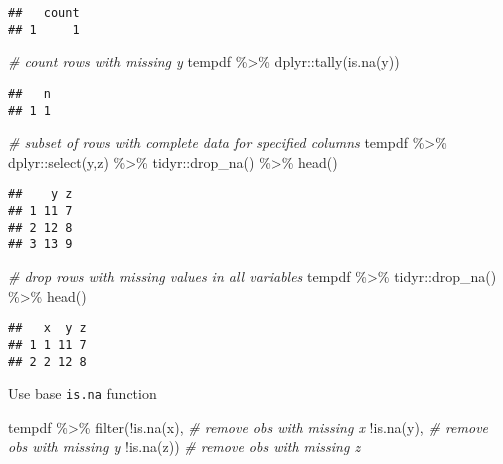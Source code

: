 \documentclass[
]{book}
\newenvironment{Shaded}{\begin{snugshade}}{\end{snugshade}}
\newcommand{\CommentTok}[1]{\textcolor[rgb]{0.56,0.35,0.01}{\textit{#1}}}
\newcommand{\FunctionTok}[1]{\textcolor[rgb]{0.00,0.00,0.00}{#1}}
\newcommand{\NormalTok}[1]{#1}
\newcommand{\SpecialCharTok}[1]{\textcolor[rgb]{0.00,0.00,0.00}{#1}}
\begin{document}
\begin{verbatim}
##   count
## 1     1
\end{verbatim}

\begin{Shaded}
\begin{Highlighting}[]
\CommentTok{\# count rows with missing y}
\NormalTok{tempdf }\SpecialCharTok{\%\textgreater{}\%}
\NormalTok{  dplyr}\SpecialCharTok{::}\FunctionTok{tally}\NormalTok{(}\FunctionTok{is.na}\NormalTok{(y))}
\end{Highlighting}
\end{Shaded}

\begin{verbatim}
##   n
## 1 1
\end{verbatim}

\begin{Shaded}
\begin{Highlighting}[]
\CommentTok{\# subset of rows with complete data for specified columns}
\NormalTok{tempdf }\SpecialCharTok{\%\textgreater{}\%}
\NormalTok{  dplyr}\SpecialCharTok{::}\FunctionTok{select}\NormalTok{(y,z) }\SpecialCharTok{\%\textgreater{}\%}
\NormalTok{  tidyr}\SpecialCharTok{::}\FunctionTok{drop\_na}\NormalTok{() }\SpecialCharTok{\%\textgreater{}\%}
  \FunctionTok{head}\NormalTok{()}
\end{Highlighting}
\end{Shaded}

\begin{verbatim}
##    y z
## 1 11 7
## 2 12 8
## 3 13 9
\end{verbatim}

\begin{Shaded}
\begin{Highlighting}[]
\CommentTok{\#   drop rows with missing values in all variables}
\NormalTok{tempdf }\SpecialCharTok{\%\textgreater{}\%}
\NormalTok{  tidyr}\SpecialCharTok{::}\FunctionTok{drop\_na}\NormalTok{() }\SpecialCharTok{\%\textgreater{}\%}
  \FunctionTok{head}\NormalTok{()}
\end{Highlighting}
\end{Shaded}

\begin{verbatim}
##   x  y z
## 1 1 11 7
## 2 2 12 8
\end{verbatim}

Use base \texttt{is.na} function

\begin{Shaded}
\begin{Highlighting}[]
\NormalTok{tempdf }\SpecialCharTok{\%\textgreater{}\%}
  \FunctionTok{filter}\NormalTok{(}\SpecialCharTok{!}\FunctionTok{is.na}\NormalTok{(x),           }\CommentTok{\# remove obs with missing x}
         \SpecialCharTok{!}\FunctionTok{is.na}\NormalTok{(y),  }\CommentTok{\# remove obs with missing y}
         \SpecialCharTok{!}\FunctionTok{is.na}\NormalTok{(z))                }\CommentTok{\# remove obs with missing z}
\end{Highlighting}
\end{Shaded}
\end{document}
